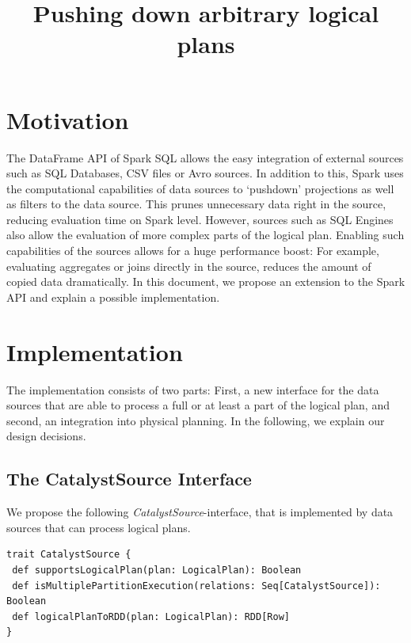 \documentclass{article}
\begin{document}
\title{Pushing down arbitrary logical plans}
\maketitle

\section{Motivation}

The DataFrame API of Spark SQL allows the easy integration of external sources such as SQL Databases, CSV files or Avro sources. In addition to this, Spark uses the computational capabilities of data sources to ‘push­down’ projections as well as filters to the data source. This prunes unnecessary data right in the source, reducing evaluation time on Spark level. However, sources such as SQL Engines also allow the evaluation of more complex parts of the logical plan. Enabling such capabilities of the sources allows for a huge performance boost: For example, evaluating aggregates or joins directly in the source, reduces the amount of copied data dramatically. In this document, we propose an extension to the Spark API and explain a possible implementation.

\section{Implementation}

The implementation consists of two parts: First, a new interface for the data sources that are able to process a full or at least a part of the logical plan, and second, an integration into physical planning. In the following, we explain our design decisions. 

\subsection{The CatalystSource Interface}

We propose the following \textit{CatalystSource}-interface, that is implemented by data sources that can process logical plans.

\begin{lstlisting}[frame=single]
trait CatalystSource {
 def supportsLogicalPlan(plan: LogicalPlan): Boolean
 def isMultiplePartitionExecution(relations: Seq[CatalystSource]): Boolean
 def logicalPlanToRDD(plan: LogicalPlan): RDD[Row]
}
\end{lstlisting}
\end{document}
